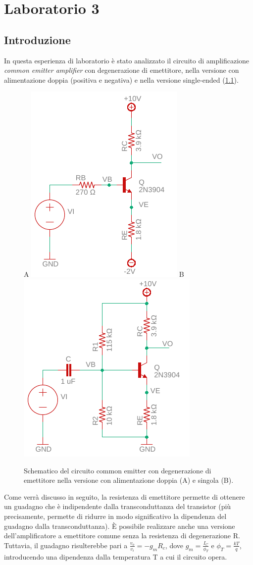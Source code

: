 \chapter{Laboratorio 3}
\section{Introduzione}
In questa esperienza di laboratorio è stato analizzato il circuito di amplificazione \textit{common emitter amplifier} con degenerazione di emettitore, nella versione con alimentazione doppia (positiva e negativa) e nella versione single-ended (\Fig\ref{fig:commonemitter}).
\begin{figure}[h!]
	\centering
	A
	\includegraphics[width=0.4\linewidth]{./OtherFiles/Laboratorio 3/common emitter}
	B
	\includegraphics[width=0.4\linewidth]{./OtherFiles/Laboratorio 3/common emitter_se}
	\caption{Schematico del circuito common emitter con degenerazione di emettitore nella versione con alimentazione doppia (A) e singola (B).}
	\label{fig:commonemitter}
\end{figure}
Come verrà discusso in seguito, la resistenza di emettitore permette di ottenere un guadagno che è indipendente dalla transconduttanza del transistor (più precisamente, permette di ridurre in modo significativo la dipendenza del guadagno dalla transconduttanza). \`E possibile realizzare anche una versione dell'amplificatore a emettitore comune senza la resistenza di degenerazione R. Tuttavia, il guadagno risulterebbe pari a $\frac{v_o}{v_i}=-g_m R_c$, dove $g_m=\frac{I_C}{\phi_T}$ e $\phi_T=\frac{k T}{q}$, introducendo una dipendenza dalla temperatura T a cui il circuito opera.

